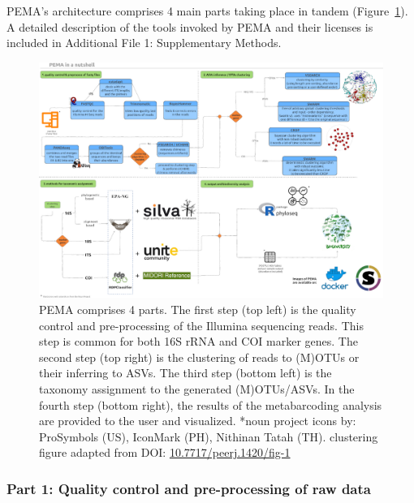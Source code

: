    PEMA's architecture comprises 4 main parts taking place in tandem (Figure~\ref{fig:pema-nutshell}). A detailed description of the tools invoked by PEMA and their licenses is included in Additional File 1: Supplementary Methods.

   \begin{figure}[h]
      \centering
      \includegraphics[width=0.95\columnwidth]{figures/pema_workflow.jpeg}
      \caption[PEMA in a nutshell]{PEMA comprises 4 parts. The first step (top left) is the quality control and pre-processing of the Illumina sequencing reads. This step is common for both 16S rRNA and COI marker genes. The second step (top right) is the clustering of reads to (M)OTUs or their inferring to ASVs. The third step (bottom left) is the taxonomy assignment to the generated (M)OTUs/ASVs. In the fourth step (bottom right), the results of the metabarcoding analysis are provided to the user and visualized. *noun project icons by: ProSymbols (US), IconMark (PH), Nithinan Tatah (TH). clustering figure adapted from 
      DOI: \href{https://peerj.com/articles/1420/\#fig-1}{10.7717/peerj.1420/fig-1}}
      \label{fig:pema-nutshell}
   \end{figure}


   \subsubsection*{Part 1: Quality control and pre-processing of raw data}

